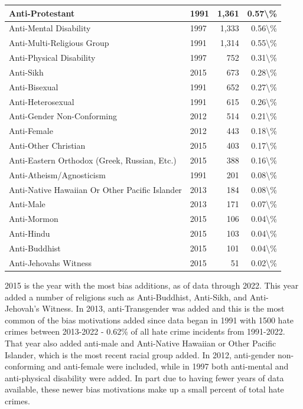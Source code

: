 \documentclass[
]{krantz}
\begin{document}
\begin{longtable}[t]{l|l|r|r}
\hline
Anti-Protestant & 1991 & 1,361 & 0.57\textbackslash{}\%\\
\hline
Anti-Mental Disability & 1997 & 1,333 & 0.56\textbackslash{}\%\\
\hline
Anti-Multi-Religious Group & 1991 & 1,314 & 0.55\textbackslash{}\%\\
\hline
Anti-Physical Disability & 1997 & 752 & 0.31\textbackslash{}\%\\
\hline
Anti-Sikh & 2015 & 673 & 0.28\textbackslash{}\%\\
\hline
Anti-Bisexual & 1991 & 652 & 0.27\textbackslash{}\%\\
\hline
Anti-Heterosexual & 1991 & 615 & 0.26\textbackslash{}\%\\
\hline
Anti-Gender Non-Conforming & 2012 & 514 & 0.21\textbackslash{}\%\\
\hline
Anti-Female & 2012 & 443 & 0.18\textbackslash{}\%\\
\hline
Anti-Other Christian & 2015 & 403 & 0.17\textbackslash{}\%\\
\hline
Anti-Eastern Orthodox (Greek, Russian, Etc.) & 2015 & 388 & 0.16\textbackslash{}\%\\
\hline
Anti-Atheism/Agnosticism & 1991 & 201 & 0.08\textbackslash{}\%\\
\hline
Anti-Native Hawaiian Or Other Pacific Islander & 2013 & 184 & 0.08\textbackslash{}\%\\
\hline
Anti-Male & 2013 & 171 & 0.07\textbackslash{}\%\\
\hline
Anti-Mormon & 2015 & 106 & 0.04\textbackslash{}\%\\
\hline
Anti-Hindu & 2015 & 103 & 0.04\textbackslash{}\%\\
\hline
Anti-Buddhist & 2015 & 101 & 0.04\textbackslash{}\%\\
\hline
Anti-Jehovahs Witness & 2015 & 51 & 0.02\textbackslash{}\%\\
\hline
\end{longtable}

2015 is the year with the most bias additions, as of data
through 2022. This year added a number of religions such as
Anti-Buddhist, Anti-Sikh, and Anti-Jehovah's Witness. In
2013, anti-Transgender was added and this is the most common
of the bias motivations added since data began in 1991 with
1500 hate crimes between 2013-2022 - 0.62\% of all hate
crime incidents from 1991-2022. That year also added
anti-male and Anti-Native Hawaiian or Other Pacific
Islander, which is the most recent racial group added. In
2012, anti-gender non-conforming and anti-female were
included, while in 1997 both anti-mental and anti-physical
disability were added. In part due to having fewer years of
data available, these newer bias motivations make up a small
percent of total hate crimes.
\end{document}

